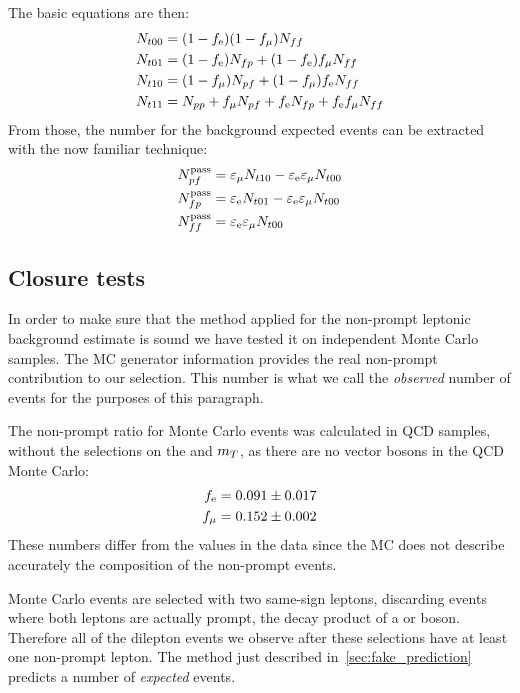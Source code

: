 The basic equations are then:
\begin{align*}
    N_{t00} &= (1 - f_{\mathrm{e}})(1 - f_{\mu}) N_{ff}\\
    N_{t01} &= (1 - f_{\mathrm{e}})N_{fp} + (1 - f_{\mathrm{e}})f_{\mu} N_{ff}\\
    N_{t10} &= (1 - f_{\mu})N_{pf} + (1 - f_{\mu})f_{\mathrm{e}} N_{ff}\\
    N_{t11} &= N_{pp} + f_{\mu} N_{pf} + f_{\mathrm{e}} N_{fp} + f_{\mathrm{e}} f_{\mu} N_{ff}
\end{align*}
From those, the number for the background expected events can be extracted with the
now familiar technique:
\begin{align*}
    N_{pf}^\text{pass} &= \varepsilon_{\mu} N_{t10} - \varepsilon_{\mathrm{e}}
    \varepsilon_{\mu} N_{t00}\\
    N_{fp}^\text{pass} &= \varepsilon_{\mathrm{e}} N_{t01} -
    \varepsilon_{\mathrm{e}} \varepsilon_{\mu} N_{t00}\\
    N_{ff}^\text{pass} &= \varepsilon_{\mathrm{e}} \varepsilon_{\mu} N_{t00}
\end{align*}

\subsection{Closure tests}\label{sec:closure}
In order to make sure that the method applied for the non-prompt leptonic
background estimate is sound we have tested it on independent Monte Carlo
samples. The MC generator information provides the real non-prompt
contribution to our selection. This number is what we call the
\emph{observed} number of events for the purposes of this paragraph.

The non-prompt ratio for Monte Carlo events was calculated 
in QCD samples, without the selections on the
\met and $m_T$,  as there are no vector bosons in the QCD Monte Carlo:
\begin{align*}
    f_{\mathrm{e}} &= 0.091 \pm 0.017\\
    f_{\mu} &= 0.152 \pm 0.002
\end{align*}
These numbers differ from the values in the data since the MC does not
describe accurately the composition of the non-prompt events.

Monte Carlo events are selected with two same-sign leptons, discarding
events where both leptons are actually prompt, \ie the decay
product of a \W or \Z boson.
Therefore all of the dilepton events we observe after
these selections have at least one non-prompt lepton. The method just
described in~\ref{sec:fake_prediction} predicts a
number of \emph{expected} events.

